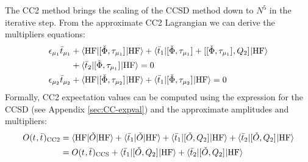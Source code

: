 The \acrshort*{CC2} method brings the scaling of the \acrshort*{CCSD}
method down to $N^5$ in the iterative step.
From the approximate \acrshort*{CC2} Lagrangian we can derive the
multipliers equations:
\begin{subequations}\label{eq:cc2-multipliers}
  \begin{align}
    \epsilon_{\mu_1}\bar{t}_{\mu_1} &+
     \braket{\mathrm{HF} | [ \check{\Phi}, \tau_{\mu_1} ]^{} | \mathrm{HF}}
   + \braket{\bar{t}_{1} |
       [ \check{\Phi}, \tau_{\mu_1} ]^{}
     + [ [ \check{\Phi}, \tau_{\mu_1} ]^{}, Q_2 ]^{}
     | \mathrm{HF}} \nonumber \\
   &+ \braket{\bar{t}_{2} | [ \check{\Phi}, \tau_{\mu_1} ]^{} |
   \mathrm{HF}} = 0 \label{eq:cc2-singles-multipliers} \\
    \epsilon_{\mu_2}\bar{t}_{\mu_2} &+
    \braket{\mathrm{HF} | [ \check{\Phi}, \tau_{\mu_2} ]^{} | \mathrm{HF}}
   + \braket{\bar{t}_{1} |
       [ \check{\Phi}, \tau_{\mu_2} ]^{}
     | \mathrm{HF}}
     = 0 \label{eq:cc2-doubles-multipliers}
  \end{align}
\end{subequations}
Formally, \acrshort*{CC2} expectation values can be computed using the
expression for the \acrshort*{CCSD} (see Appendix \ref{sec:CC-expval})
and the approximate amplitudes and multipliers:
\begin{equation}\label{eq:cc2-expectation-value}
  \begin{aligned}
  O(t_{}, \bar{t}_{})_\mathrm{CC2}
  &=
  \braket{\mathrm{HF} | \check{O} | \mathrm{HF} }
  + \braket{\bar{t}_{1} | \check{O} | \mathrm{HF} }
  + \braket{\bar{t}_{1} | [ \check{O}, Q_2 ]^{} | \mathrm{HF} }
  + \braket{\bar{t}_{2} | [ \check{O}, Q_2 ]^{} | \mathrm{HF} } \\
  &=
  O(t_{}, \bar{t}_{})_\mathrm{CCS}
  + \braket{\bar{t}_{1} | [ \check{O}, Q_2 ]^{} | \mathrm{HF} }
  + \braket{\bar{t}_{2} | [ \check{O}, Q_2 ]^{} | \mathrm{HF} }
  \end{aligned}
\end{equation}

